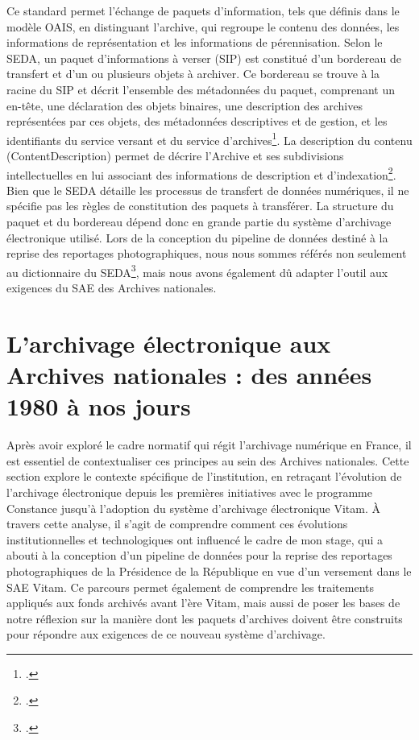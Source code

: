 Ce standard permet l'échange de paquets d'information, tels que définis dans le modèle OAIS, en distinguant l'archive, qui regroupe le contenu des données, les informations de représentation et les informations de pérennisation. Selon le SEDA, un paquet d'informations à verser (SIP) est constitué d'un bordereau de transfert et d'un ou plusieurs objets à archiver. Ce bordereau se trouve à la racine du SIP et décrit l'ensemble des métadonnées du paquet, comprenant un en-tête, une déclaration des objets binaires, une description des archives représentées par ces objets, des métadonnées descriptives et de gestion, et les identifiants du service versant et du service d'archives\footcite[p.14]{programmevitamStructurationSubmissionInformation2023}. La description du contenu (ContentDescription) permet de décrire l’Archive et ses subdivisions intellectuelles en lui associant des informations de description et d’indexation\footcite{sibilleStandardEchangeDonnees2015}.
\\

Bien que le SEDA détaille les processus de transfert de données numériques, il ne spécifie pas les règles de constitution des paquets à transférer. La structure du paquet et du bordereau dépend donc en grande partie du système d'archivage électronique utilisé. Lors de la conception du pipeline de données destiné à la reprise des reportages photographiques, nous nous sommes référés non seulement au dictionnaire du SEDA\footcite{siafseda}, mais nous avons également dû adapter l'outil aux exigences du SAE des Archives nationales. 


\section{L'archivage électronique aux Archives nationales : des années 1980 à nos jours}

Après avoir exploré le cadre normatif qui régit l'archivage numérique en France, il est essentiel de contextualiser ces principes au sein des Archives nationales. Cette section explore le contexte spécifique de l'institution, en retraçant l’évolution de l’archivage électronique depuis les premières initiatives avec le programme Constance jusqu’à l’adoption du système d’archivage électronique Vitam. À travers cette analyse, il s’agit de comprendre comment ces évolutions institutionnelles et technologiques ont influencé le cadre de mon stage, qui a abouti à la conception d’un pipeline de données pour la reprise des reportages photographiques de la Présidence de la République en vue d'un versement dans le SAE Vitam. Ce parcours permet également de comprendre les traitements appliqués aux fonds archivés avant l'ère Vitam, mais aussi de poser les bases de notre réflexion sur la manière dont les paquets d'archives doivent être construits pour répondre aux exigences de ce nouveau système d'archivage.

